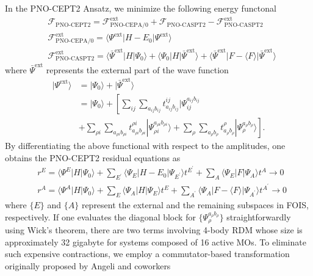 \documentclass[aip,jcp,amsmath]{revtex4-1}
\begin{document}
%
In the PNO-CEPT2 Ansatz, we minimize the following energy functonal
%
\begin{align}
  &\mathscr{F}_\text{PNO-CEPT2} = \mathscr{F}_\text{PNO-CEPA/0}^\text{ext}+\mathscr{F}_\text{PNO-CASPT2}-\mathscr{F}_\text{PNO-CASPT2}^\text{ext} \label{eq:F-CEPT2} \\
  &\mathscr{F}_\text{PNO-CEPA/0}^\text{ext} = \langle\Psi^\text{ext}|H-E_0|\Psi^\text{ext}\rangle \label{eq:F-CEPA/0} \\
  &\mathscr{F}_\text{PNO-CASPT2}^\text{ext} = \langle\bar{\Psi}^\text{ext}|H|\Psi_0\rangle + \langle\Psi_0|H|\bar{\Psi}^\text{ext}\rangle+\langle\bar{\Psi}^\text{ext}|F-\langle F\rangle|\bar{\Psi}^\text{ext}\rangle \label{eq:F-CASPT2}
\end{align}
%
where $\bar{\Psi}^\text{ext}$ represents the external part of the wave function
%
\begin{align}
  |\Psi^\text{ext}\rangle&=|\Psi_0\rangle+|\bar{\Psi}^\text{ext}\rangle \nonumber \\
  &=|\Psi_0\rangle+\left[\sum_{ij}\sum_{a_{ij}b_{ij}} t_{a_{ij}b_{ij}}^{ij}|\Psi^{a_{ij}b_{ij}}_{ij} \right. \nonumber \\
    &+ \left.\sum_{\rho i}\sum_{a_{\rho i}b_{\rho i}} t_{a_{\rho i}b_{\rho i}}^{\rho i}|\Psi^{a_{\rho i}b_{\rho i}}_{\rho i}\rangle + \sum_{\rho}\sum_{a_{\rho}b_{\rho}} t_{a_{\rho}b_{\rho}}^{\rho}|\Psi^{a_{\rho}b_{\rho}}_{\rho}\rangle\right].
\end{align}
%
By differentiating the above functional with respect to the amplitudes, one obtains the PNO-CEPT2 residual equations as
%
\begin{align}
  &r^{E}=\langle\Psi^{E}|H|\Psi_0\rangle+\sum_{E^{'}}\langle\Psi_E|H-E_0|\Psi_{E^{'}}\rangle t^{E^{'}}+\sum_{A}\langle\Psi_E|F|\Psi_A\rangle t^A \rightarrow 0 \label{eq:CEPT-E} \\
  &r^{A}=\langle\Psi^{A}|H|\Psi_0\rangle+\sum_{E}\langle\Psi_A|H|\Psi_E\rangle t^E+\sum_{A^{'}}\langle\Psi_A|F-\langle F\rangle|\Psi_{A^{'}}\rangle t^{A^{'}} \rightarrow 0 \label{eq:CEPT-A}
\end{align}
%
where $\{E\}$ and $\{A\}$ represent the external and the remaining subspaces in FOIS, respectively.
%
If one evaluates the diagonal block for $\{\Psi_{\rho}^{a_{\rho}b_{\rho}}\}$ straightforwardly using Wick's theorem, there are two terms involving 4-body RDM whose size is approximately 32 gigabyte for systems composed of 16 active MOs.
%
To eliminate such expensive contractions, we employ a commutator-based transformation originally proposed by Angeli and coworkers\cite{angeliintroduction2001,angelin-electron2002,angelinew2006}
\end{document}
